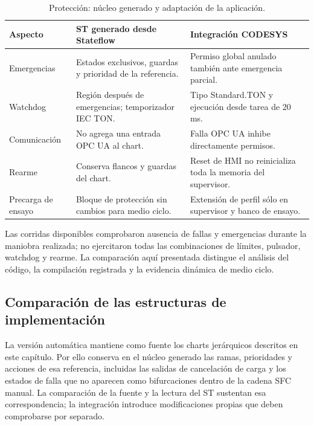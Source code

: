 \documentclass[a4paper,10pt,onecolumn,journal]{ieeeconf}
\numberwithin{equation}{section}
\begin{document}
\begin{table}[!htb]
\centering\footnotesize
\caption{Protección: núcleo generado y adaptación de la aplicación.}\label{tab:seguridad_auto_capas}
\begin{tabular}{L{3.6cm} L{5.5cm} L{5.5cm}}
\toprule
Aspecto & ST generado desde Stateflow & Integración CODESYS\\
\midrule
Emergencias & Estados exclusivos, guardas y prioridad de la referencia. & Permiso global anulado también ante emergencia parcial.\\
Watchdog & Región después de emergencias; temporizador IEC TON. & Tipo Standard.TON y ejecución desde tarea de 20 ms.\\
Comunicación & No agrega una entrada OPC UA al chart. & Falla OPC UA inhibe directamente permisos.\\
Rearme & Conserva flancos y guardas del chart. & Reset de HMI no reinicializa toda la memoria del supervisor.\\
Precarga de ensayo & Bloque de protección sin cambios para medio ciclo. & Extensión de perfil sólo en supervisor y banco de ensayo.\\
\bottomrule
\end{tabular}
\end{table}

Las corridas disponibles comprobaron ausencia de fallas y emergencias durante la maniobra realizada; no ejercitaron todas las combinaciones de límites, pulsador, watchdog y rearme. La comparación aquí presentada distingue el análisis del código, la compilación registrada y la evidencia dinámica de medio ciclo.


\subsection{Comparación de las estructuras de implementación}
La versión automática mantiene como fuente los charts jerárquicos descritos en este capítulo. Por ello conserva en el núcleo generado las ramas, prioridades y acciones de esa referencia, incluidas las salidas de cancelación de carga y los estados de falla que no aparecen como bifurcaciones dentro de la cadena SFC manual. La comparación de la fuente y la lectura del ST sustentan esa correspondencia; la integración introduce modificaciones propias que deben comprobarse por separado.
\end{document}
